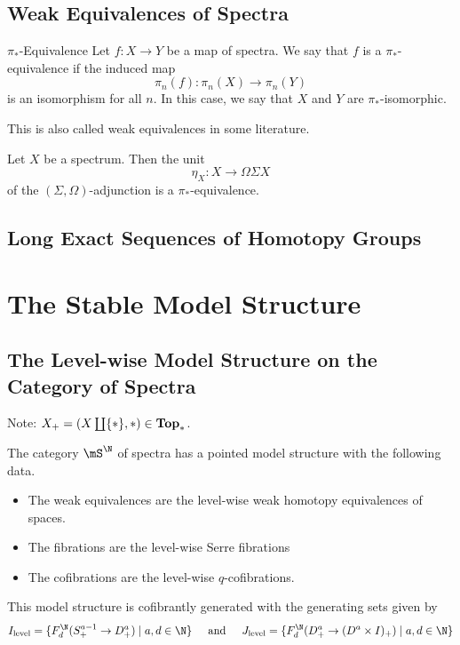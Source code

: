 \documentclass[a4paper]{article}
\begin{document}
\subsection{Weak Equivalences of Spectra}
\begin{defn}{$\pi_\ast$-Equivalence}{} Let $f:X\to Y$ be a map of spectra. We say that $f$ is a $\pi_\ast$-equivalence if the induced map $$\pi_n(f):\pi_n(X)\to\pi_n(Y)$$ is an isomorphism for all $n$. In this case, we say that $X$ and $Y$ are $\pi_\ast$-isomorphic. 
\end{defn}

This is also called weak equivalences in some literature. 

\begin{prp}{}{} Let $X$ be a spectrum. Then the unit $$\eta_X:X\to\Omega\Sigma X$$ of the $(\Sigma,\Omega)$-adjunction is a $\pi_\ast$-equivalence. 
\end{prp}

\subsection{Long Exact Sequences of Homotopy Groups}

\pagebreak
\section{The Stable Model Structure}
\subsection{The Level-wise Model Structure on the Category of Spectra}
Note: $X_+=(X\coprod\{\ast\},\ast)\in\bold{Top}_\ast$. 

\begin{thm}{}{} The category $\mS^\N$ of spectra has a pointed model structure with the following data. 
\begin{itemize}
\item The weak equivalences are the level-wise weak homotopy equivalences of spaces. 
\item The fibrations are the level-wise Serre fibrations
\item The cofibrations are the level-wise $q$-cofibrations. 
\end{itemize}
This model structure is cofibrantly generated with the generating sets given by $$I_\text{level}=\{F_d^\N(S_+^{a-1}\to D_+^a)\;|\;a,d\in\N\}\;\;\;\;\text{ and }\;\;\;\; J_\text{level}=\{F_d^\N(D_+^a\to(D^a\times I)_+)\;|\;a,d\in\N\}$$
\end{thm}
\end{document}
